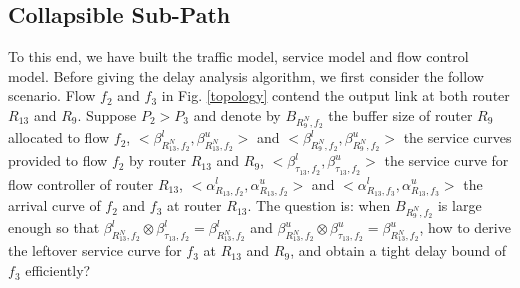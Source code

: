 \documentclass[10pt,journal]{IEEEtran}
\begin{document}
\subsection{Collapsible Sub-Path}\label{csp}
To this end, we have built the traffic model, service model and flow control model. Before giving the delay analysis algorithm, we first consider the follow scenario. Flow $f_2$ and $f_3$ in Fig. \ref{topology} contend the output link at both router $R_{13}$ and $R_{9}$. Suppose $P_2>P_3$ and denote by $B_{R_9^N,f_2}$ the buffer size of router $R_{9}$ allocated to flow $f_2$, $<\beta_{R_{13}^N,f_2}^l,\beta_{R_{13}^N,f_2}^u>$ and $<\beta_{R_{9}^N,f_2}^l,\beta_{R_{9}^N,f_2}^u>$ the service curves provided to flow $f_2$ by router $R_{13}$ and $R_{9}$, $<\beta_{\tau_{13},f_2}^l,\beta_{\tau_{13},f_2}^u>$ the service curve for flow controller of router $R_{13}$, $<\alpha_{R_{13},f_2}^l,\alpha_{R_{13},f_2}^u>$ and $<\alpha_{R_{13},f_3}^l,\alpha_{R_{13},f_3}^u>$ the arrival curve of $f_2$ and $f_3$ at router $R_{13}$. The question is: when $B_{R_9^N,f_2}$ is large enough so that $\beta_{R_{13}^N,f_2}^l\otimes\beta_{\tau_{13},f_2}^l=\beta_{R_{13}^N,f_2}^l$ and $\beta_{R_{13}^N,f_2}^u\otimes\beta_{\tau_{13},f_2}^u=\beta_{R_{13}^N,f_2}^u$, how to derive the leftover service curve for $f_3$ at $R_{13}$ and $R_9$, and obtain a tight delay bound of $f_3$ efficiently?
\end{document}
